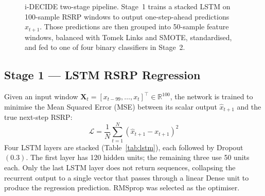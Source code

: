 \documentclass[journal]{IEEEtran}
\begin{document}
\begin{figure}[!t]
{%
}
\caption{i-DECIDE two-stage pipeline. Stage~1 trains a stacked LSTM on
100-sample RSRP windows to output one-step-ahead predictions
$\hat{x}_{t+1}$. Those predictions are then grouped into 50-sample
feature windows, balanced with Tomek Links and SMOTE, standardised, and
fed to one of four binary classifiers in Stage~2.}
\label{fig:arch}
\end{figure}

\subsection{Stage 1 --- LSTM RSRP Regression}

Given an input window $\mathbf{X}_t = [x_{t-99},\ldots,x_t]^\top \in
\mathbb{R}^{100}$, the network is trained to minimise the Mean Squared
Error (MSE) between its scalar output $\hat{x}_{t+1}$ and the true
next-step RSRP:
\begin{equation}
  \mathcal{L} = \frac{1}{N}\sum_{t=1}^{N}(\hat{x}_{t+1} - x_{t+1})^2
  \label{eq:mse}
\end{equation}
Four LSTM layers are stacked (Table~\ref{tab:lstm}), each followed by
Dropout$(0.3)$. The first layer has 120 hidden units; the remaining
three use 50 units each. Only the last LSTM layer does not return
sequences, collapsing the recurrent output to a single vector that
passes through a linear Dense unit to produce the regression prediction.
RMSprop \cite{tieleman2012} was selected as the optimiser.
\end{document}
